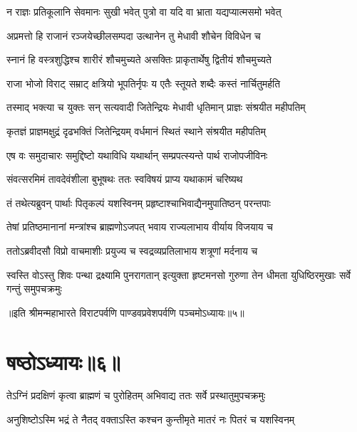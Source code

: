 \twolineshloka
{न राज्ञः प्रतिकूलानि सेवमानः सुखी भवेत्}
{पुत्रो वा यदि वा भ्राता यद्यप्यात्मसमो भवेत्}


\twolineshloka
{अप्रमत्तो हि राजानं रञ्जयेच्छीलसम्पदा}
{उत्थानेन तु मेधावी शौचेन विविधेन च}


\twolineshloka
{स्नानं हि वस्त्रशुद्धिश्च शारीरं शौचमुच्यते}
{असक्तिः प्राकृतार्थेषु द्वितीयं शौचमुच्यते}


\twolineshloka
{राजा भोजो विराट् सम्राट् क्षत्रियो भूपतिर्नृपः}
{य एतैः स्तूयते शब्दैः कस्तं नार्चितुमर्हति}


\twolineshloka
{तस्माद् भक्त्या च युक्तः सन् सत्यवादी जितेन्द्रियः}
{मेधावी धृतिमान् प्राज्ञः संश्रयीत महीपतिम्}


\twolineshloka
{कृतज्ञं प्राज्ञमक्षुद्रं दृढभक्तिं जितेन्द्रियम्}
{वर्धमानं स्थितं स्थाने संश्रयीत महीपतिम्}


\twolineshloka
{एष वः समुदाचारः समुद्दिष्टो यथाविधि}
{यथार्थान् सम्प्रपत्स्यन्ते पार्थ राजोपजीविनः}


\twolineshloka
{संवत्सरमिमं तावदेवंशीला बुभूषथः}
{ततः स्वविषयं प्राप्य यथाकामं चरिष्यथ}



\twolineshloka
{तं तथेत्यब्रुवन् पार्थाः पितृकल्पं यशस्विनम्}
{प्रहृष्टाश्चाभिवाद्यैनमुपातिष्ठन् परन्तपाः}


\twolineshloka
{तेषां प्रतिष्ठमानानां मन्त्रांश्च ब्राह्मणोऽजपत्}
{भवाय राज्यलाभाय वीर्याय विजयाय च}


\twolineshloka
{ततोऽब्रवीदसौ विप्रो वाचमाशीः प्रयुज्य च}
{स्वद्रव्यप्रतिलाभाय शत्रूणां मर्दनाय च}


\threelineshloka
{स्वस्ति वोऽस्तु शिवः पन्था द्रक्ष्यामि पुनरागतान्}
{इत्युक्ता हृष्टमनसो गुरुणा तेन धीमता}
{युधिष्ठिरमुखाः सर्वे गन्तुं समुपचक्रमुः}

॥इति श्रीमन्महाभारते विराटपर्वणि पाण्डवप्रवेशपर्वणि पञ्चमोऽध्यायः॥५॥

\chapter{षष्ठोऽध्यायः॥६॥}

\twolineshloka
{तेऽग्निं प्रदक्षिणं कृत्वा ब्राह्मणं च पुरोहितम्}
{अभिवाद्य ततः सर्वे प्रस्थातुमुपचक्रमुः}




\twolineshloka
{अनुशिष्टोऽस्मि भद्रं ते नैतद् वक्ताऽस्ति कश्चन}
{कुन्तीमृते मातरं नः पितरं च यशस्विनम्}


